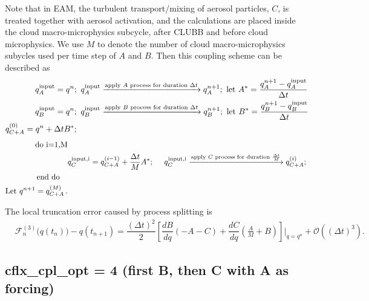\documentclass[12pt]{article}
\begin{document}
Note that in EAM, the turbulent transport/mixing of aerosol particles, $C$, is treated together with
aerosol activation, and the calculations are placed inside the cloud macro-microphysics subcycle,
after CLUBB and before cloud microphysics.
We use $M$ to denote the number of cloud macro-microphysics subycles used per time step of $A$ and $B$.
Then this coupling scheme can be described as
%
\begin{align*}
q^{\rm input}_{A} = q^n;\,\,\,
&q^{\rm input}_{A} \xrightarrow{\text{apply $A$ process for duration $\Delta t$}} q^{n+1}_{A};\,\,
\text{let}\,\, {A}^* = \dfrac{q^{n+1}_{A} - q^{\rm input}_{A}}{\Delta t} \\
%
q^{\rm input}_{B} = q^n;\,\,\, 
& q^{\rm input}_{B} \xrightarrow{\text{apply $B$ process for duration $\Delta t$}} q^{n+1}_{B};\,\, 
\text{let}\,\, {B}^* = \dfrac{q^{n+1}_{B} - q^{\rm input}_{B}}{\Delta t} \\
%
q^{(0)}_{C+A} = q^n + \Delta t {B}^*;\,\,\, 
\end{align*}
\begin{align*}
\text{ do i=1,M} \\
&q^{\rm input, i}_{C} = q^{(i-1)}_{C+A} + \frac{\Delta t }{M}  {A}^*;\,\,\, 
& q^{\rm input,i}_{C}\xrightarrow{\text{apply $C$ process for duration $\frac{\Delta t }{M} $}} q^{(i)}_{C+A};\,\, 
\\
\text{ end do}\quad\\
%
\text{Let}\,\, q^{n+1} = q^{(M)}_{C+A} \,. 
\end{align*}

The local truncation error caused by process splitting is
\begin{align}
&\mathcal{F}_n^{(3)}\Big(q(t_n)\Big) - q(t_{n+1}) 
= \dfrac{(\Delta t)^2}{2}\left[  \dfrac{dB}{dq}(-A-C) + \dfrac{dC}{dq}\left(\frac{A}{M}+B\right)\right]\bigg|_{q=q^n}
+\mathcal{O}\left( (\Delta t)^3\right).
\end{align}


\subsection{{\sf cflx\_cpl\_opt = 4} (first B, then  C with A as forcing)}
\end{document}
